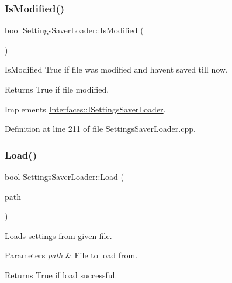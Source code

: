 \subsubsection{\texorpdfstring{Is\+Modified()}{IsModified()}}
{\footnotesize\ttfamily bool Settings\+Saver\+Loader\+::\+Is\+Modified (\begin{DoxyParamCaption}{ }\end{DoxyParamCaption})\hspace{0.3cm}{\ttfamily [virtual]}}



Is\+Modified True if file was modified and haven\textquotesingle{}t saved till now. 

\begin{DoxyReturn}{Returns}
True if file modified. 
\end{DoxyReturn}


Implements \hyperlink{class_interfaces_1_1_i_settings_saver_loader_a4c3f69d0bc7c355030c8d371367108d3}{Interfaces\+::\+I\+Settings\+Saver\+Loader}.



Definition at line 211 of file Settings\+Saver\+Loader.\+cpp.

\mbox{\label{class_settings_saver_loader_aaf225d7d568ce33f6350d886bb40312a}} 
\subsubsection{\texorpdfstring{Load()}{Load()}}
{\footnotesize\ttfamily bool Settings\+Saver\+Loader\+::\+Load (\begin{DoxyParamCaption}\item[{Q\+String}]{path }\end{DoxyParamCaption})\hspace{0.3cm}{\ttfamily [virtual]}}



Loads settings from given file. 


\begin{DoxyParams}{Parameters}
{\em path} & File to load from. \\
\hline
\end{DoxyParams}
\begin{DoxyReturn}{Returns}
True if load successful. 
\end{DoxyReturn}


